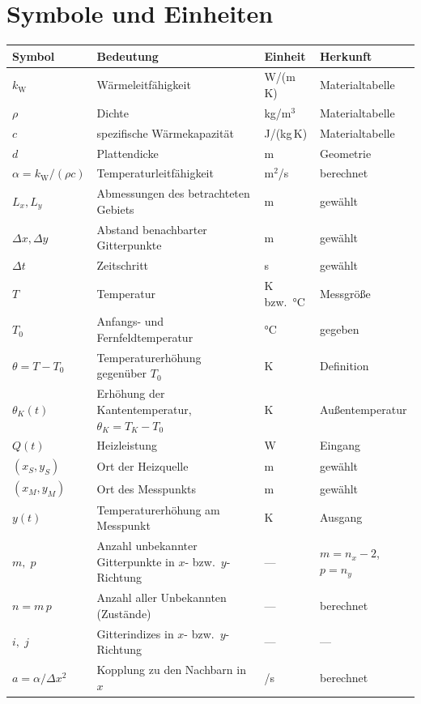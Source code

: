 \documentclass[11pt,a4paper]{article}
\numberwithin{equation}{section}
\newcommand{\dx}{\Delta x}
\newcommand{\dy}{\Delta y}
\newcommand{\dt}{\Delta t}
\newcommand{\kW}{k_{\mathrm W}}
\newcommand{\thK}{\theta_{K}}
\begin{document}
\section{Symbole und Einheiten}

\begin{longtable}{@{}>{\RaggedRight}p{2.4cm}>{\RaggedRight}p{6.4cm}>{\RaggedRight}p{1.9cm}>{\RaggedRight}p{3.2cm}@{}}
\toprule
Symbol & Bedeutung & Einheit & Herkunft \\
\midrule
\endhead
$\kW$ & Wärmeleitfähigkeit & W/(m\,K) & Materialtabelle \\
$\rho$ & Dichte & kg/m$^3$ & Materialtabelle \\
$c$ & spezifische Wärmekapazität & J/(kg\,K) & Materialtabelle \\
$d$ & Plattendicke & m & Geometrie \\
$\alpha=\kW/(\rho c)$ & Temperaturleitfähigkeit & m$^2$/s & berechnet \\
$L_x, L_y$ & Abmessungen des betrachteten Gebiets & m & gewählt \\
$\dx,\dy$ & Abstand benachbarter Gitterpunkte & m & gewählt \\
$\dt$ & Zeitschritt & s & gewählt \\
$T$ & Temperatur & K bzw.\ °C & Messgröße \\
$T_0$ & Anfangs- und Fernfeldtemperatur & °C & gegeben \\
$\theta=T-T_0$ & Temperaturerhöhung gegenüber $T_0$ & K & Definition \\
$\thK(t)$ & Erhöhung der Kantentemperatur, $\thK=T_K-T_0$ & K & Außentemperatur \\
$Q(t)$ & Heizleistung & W & Eingang \\
$(x_S,y_S)$ & Ort der Heizquelle & m & gewählt \\
$(x_M,y_M)$ & Ort des Messpunkts & m & gewählt \\
$y(t)$ & Temperaturerhöhung am Messpunkt & K & Ausgang \\
$m,\;p$ & Anzahl unbekannter Gitterpunkte in $x$- bzw.\ $y$-Richtung & --- & $m=n_x-2$, $p=n_y$ \\
$n=m\,p$ & Anzahl aller Unbekannten (Zustände) & --- & berechnet \\
$i,\;j$ & Gitterindizes in $x$- bzw.\ $y$-Richtung & --- & --- \\
$a=\alpha/\dx^2$ & Kopplung zu den Nachbarn in $x$ & 1/s & berechnet \\

\end{longtable}
\end{document}
